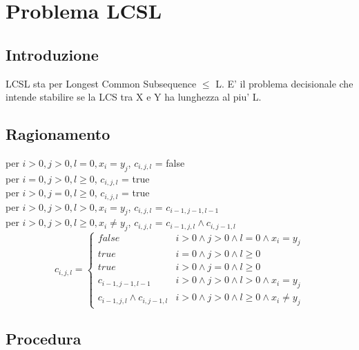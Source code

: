 \chapter{Problema LCSL}

\section{Introduzione}

LCSL sta per Longest Common Subsequence $\leq$ L. E' il problema decisionale che intende stabilire se la LCS tra X e Y ha lunghezza al piu' L.

\section{Ragionamento}

per $i > 0, j > 0, l = 0, x_i = y_j$, $c_{i,j,l}$ = false \\

per $i = 0, j > 0, l \geq 0$, $c_{i,j,l}$ = true \\

per $i > 0, j = 0, l \geq 0$, $c_{i,j,l}$ = true \\

per $i > 0, j > 0, l > 0, x_i = y_j$, $c_{i,j,l}$ = $c_{i-1,j-1,l-1}$ \\

per $i > 0, j > 0, l \geq 0, x_i \neq y_j$, $c_{i,j,l}$ = $c_{i-1,j,l} \land c_{i,j-1,l}$ \\

\[
    c_{i,j,l} = 
    \begin{cases}
        false & i > 0 \land j > 0 \land l = 0 \land x_i = y_j \\
        true & i = 0 \land j > 0 \land l \geq 0 \\
        true & i > 0 \land j = 0 \land l \geq 0 \\
        c_{i-1,j-1,l-1} & i > 0 \land j > 0 \land l > 0 \land x_i = y_j \\
        c_{i-1,j,l} \land c_{i,j-1,l} & i > 0 \land j > 0 \land l \geq 0 \land x_i \neq y_j
    \end{cases}
\]

\section{Procedura}

